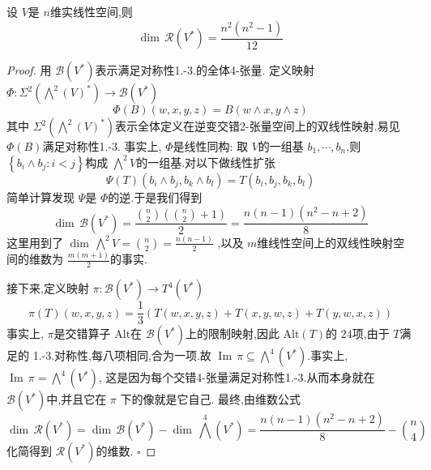 \documentclass[../../几何与拓扑.tex]{subfiles}
\begin{document}
\begin{proposition}
    设 \(  V  \)是 \(  n  \)维实线性空间,则 \[
    \operatorname{dim}\,\mathcal{R}\left( V^{*} \right)= \frac{n^{2}\left( n^{2}-1 \right)  }{12 }  
    \]  
\end{proposition}
\begin{proof}
    用 \(  \mathcal{B}\left( V^{*} \right)   \)表示满足对称性1.-3.的全体4-张量. 定义映射 \(  \Phi : \Sigma ^{2}\left( \bigwedge ^{2}\left( V \right)^{*}  \right)  \to  \mathcal{B}\left( V^{*} \right)  \)  \[
    \Phi \left( B \right) \left( w,x,y,z \right)=  B\left( w\wedge x,y\wedge z \right) 
    \]其中 \(   \Sigma ^{2}\left( \bigwedge ^{2}\left( V \right)^{*}  \right)   \)表示全体定义在逆变交错2-张量空间上的双线性映射.易见 \(  \Phi \left( B \right)   \)满足对称性1.-3. 事实上, \(  \Phi   \)是线性同构: 取 \(  V  \)的一组基 \(   b_1,\cdots,b_n   \),则  \(  \left\{ b_{i}\wedge b_{j}:i< j \right\}  \)构成 \(  \bigwedge ^{2}V  \)的一组基.对以下做线性扩张 \[
\Psi \left( T \right)\left( b_{i}\wedge b_{j},b_{k}\wedge b_{l} \right) =  T\left(b_{i},b_{j},b_{k},b_{l} \right)   
    \]       简单计算发现 \(  \Psi   \)是 \(  \Phi   \)的逆.于是我们得到 \[
    \operatorname{dim}\,\mathcal{B}\left( V^{*} \right) = \frac{\binom{n}{2}\left( \binom{n}{2}+ 1 \right)  }{2 } = \frac{n\left( n-1 \right)\left( n^{2}-n+ 2 \right)   }{8 } 
    \]  这里用到了 \(  \operatorname{dim}\,\bigwedge ^{2}V= \binom{n}{2} = \frac{n\left( n-1 \right)  }{2 }  \) ,以及 \(  m  \)维线性空间上的双线性映射空间的维数为 \(  \frac{m\left( m+ 1 \right)  }{2 }   \)的事实.  

    接下来,定义映射 \(  \pi : \mathcal{B}\left( V^{*} \right)\to T^{4}\left( V^{*} \right)    \)  \[
    \pi \left( T \right)\left( w,x,y,z \right)=  \frac{1 }{3 }\left( T\left( w,x,y,z \right)+T\left( x,y,w,z \right)+ T\left( y,w,x,z \right)    \right)    
    \]事实上, \(  \pi   \)是交错算子 \(  \mathrm{Alt}  \)在 \(  \mathcal{B}\left( V^{*} \right)   \)上的限制映射,因此 \(  \mathrm{Alt} \left( T\right)   \)的 \(  24  \)项,由于 \(  T  \)满足的 1.-3.对称性,每八项相同,合为一项.故 \(  \operatorname{Im}\,\pi \subseteq \bigwedge ^{4}\left( V^{*} \right)  \).事实上, \(  \operatorname{Im}\,\pi =  \bigwedge ^{4}\left( V^{*} \right)   \),    这是因为每个交错4-张量满足对称性1.-3.从而本身就在 \(  \mathcal{B}\left( V^{*} \right)   \)中,并且它在 \(  \pi   \)      下的像就是它自己. 最终,由维数公式 \[
    \operatorname{dim}\,\mathcal{R}\left( V^{*} \right)=  \operatorname{dim}\,\mathcal{B}\left( V^{*} \right) -\operatorname{dim}\,\bigwedge ^{4}\left( V^{*} \right)  = \frac{n\left( n-1 \right)\left( n^{2}-n+ 2 \right)   }{8 }- \binom{n}{4} 
    \]化简得到 \(  \mathcal{R}\left( V^{*} \right)   \)的维数.
    \hfill $\square$
\end{proof}
\end{document}
